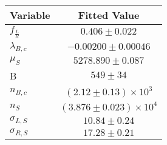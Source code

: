 \begin{tabular}[t]{lc}
\hline
Variable &Fitted Value\\
\hline\hline
$f_{\frac{L}{R}}$&$0.406\pm0.022$\\
\hline
$\lambda_{B,c}$&$-0.00200\pm0.00046$\\
\hline
$\mu_S$&$5278.890\pm0.087$\\
\hline
B&$549\pm34$\\
\hline
$n_{B,c}$&$(2.12\pm0.13)\times 10^3$\\
\hline
$n_S$&$(3.876\pm0.023)\times 10^4$\\
\hline
$\sigma_{L, S}$&$10.84\pm0.24$\\
\hline
$\sigma_{R, S}$&$17.28\pm0.21$\\
\hline
\end{tabular}